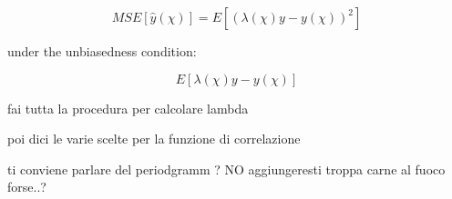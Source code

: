 \begin{equation}
MSE[\hat{y}(\chi)] = E \left[\left(\lambda(\chi)y -y(\chi)\right)^2\right]
\label{eq:var_err}
\end{equation}

under the unbiasedness condition:

\begin{equation}
E \left[ \lambda(\chi)y -y(\chi)  \right]
\end{equation}

fai tutta la procedura per calcolare lambda

poi dici le varie scelte per la funzione di correlazione 

ti conviene parlare del periodgramm ? NO aggiungeresti troppa carne al fuoco forse..?



